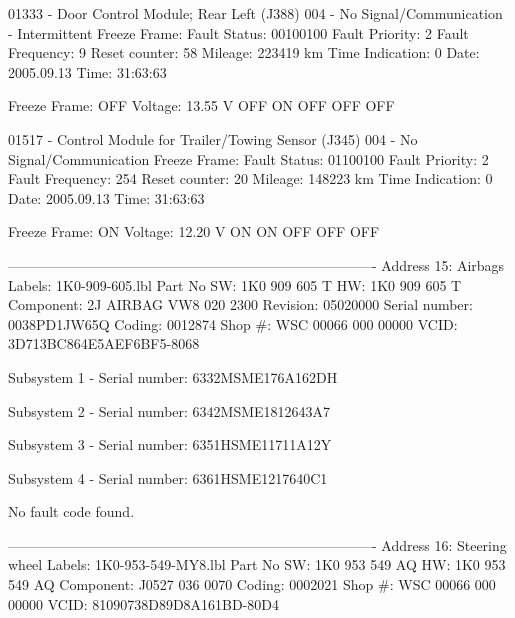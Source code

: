 01333 - Door Control Module; Rear Left (J388) 
            004 - No Signal/Communication - Intermittent
             Freeze Frame:
                    Fault Status: 00100100
                    Fault Priority: 2
                    Fault Frequency: 9
                    Reset counter: 58
                    Mileage: 223419 km
                    Time Indication: 0
                    Date: 2005.09.13
                    Time: 31:63:63

             Freeze Frame:
                        OFF
                    Voltage: 13.55 V
                        OFF
                        ON
                        OFF
                        OFF
                        OFF

01517 - Control Module for Trailer/Towing Sensor (J345) 
            004 - No Signal/Communication
             Freeze Frame:
                    Fault Status: 01100100
                    Fault Priority: 2
                    Fault Frequency: 254
                    Reset counter: 20
                    Mileage: 148223 km
                    Time Indication: 0
                    Date: 2005.09.13
                    Time: 31:63:63

             Freeze Frame:
                        ON
                    Voltage: 12.20 V
                        ON
                        ON
                        OFF
                        OFF
                        OFF


-------------------------------------------------------------------------------
Address 15: Airbags        Labels: 1K0-909-605.lbl
   Part No SW: 1K0 909 605 T    HW: 1K0 909 605 T
   Component: 2J AIRBAG VW8   020 2300  
   Revision: 05020000    Serial number: 0038PD1JW65Q  
   Coding: 0012874
   Shop #: WSC 00066 000 00000
   VCID: 3D713BC864E5AEF6BF5-8068

   Subsystem 1 - Serial number: 6332MSME176A162DH

   Subsystem 2 - Serial number: 6342MSME1812643A7

   Subsystem 3 - Serial number: 6351HSME11711A12Y

   Subsystem 4 - Serial number: 6361HSME1217640C1

No fault code found.

-------------------------------------------------------------------------------
Address 16: Steering wheel        Labels: 1K0-953-549-MY8.lbl
   Part No SW: 1K0 953 549 AQ    HW: 1K0 953 549 AQ
   Component: J0527           036 0070  
   Coding: 0002021
   Shop #: WSC 00066 000 00000
   VCID: 81090738D89D8A161BD-80D4

